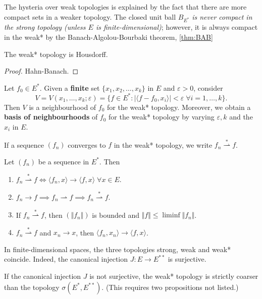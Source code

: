 \documentclass{article}
\theoremstyle{definition}
\numberwithin{equation}{section}
\begin{document}
	\begin{remark}
		The hysteria over weak topologies is explained by the fact that there are more compact sets in a weaker topology. The closed unit ball $B_{E^*}$ \textit{is never compact in the strong topology (unless $E$ is finite-dimensional)}; however, it is always compact in the weak* by the Banach-Algolou-Bourbaki theorem, \cref{thm:BAB}
	\end{remark}
	
	\begin{prop}
		The weak* topology is Housdorff.
	\end{prop}
	\begin{proof}
		Hahn-Banach.
	\end{proof}
	\begin{prop}
		Let $f_0\in E^*$. Given a \textbf{finite} set $\{x_1,x_2,\ldots,x_k\}$ in $E$ and $\varepsilon>0$, consider
		\[V=V(x_1,\ldots,x_k;\varepsilon)=\{f\in E^*:|\langle f-f_0,x_i\rangle|<\varepsilon\;\forall i=1,\ldots,k\}.\]
		Then $V$ is a neighbourhood of $f_0$ for the weak* topology. Moreover, we obtain a \textbf{basis of neighbourhoods} of $f_0$ for the weak* topology by varying $\varepsilon,k$ and the $x_i$ in $E$.
	\end{prop}
	If a sequence $(f_n)$ converges to $f$ in the weak* topology, we write $f_n\overset{*}{\rightharpoonup}f$.
	\begin{prop} Let $(f_n)$ be a sequence in $E^*$. Then
		\begin{enumerate}
			\item $f_n\overset{*}{\rightharpoonup}f \iff \langle f_n,x\rangle\to\langle f,x\rangle\;\forall x\in E$.
			\item $f_n\to f\implies f_n\rightharpoonup f\implies f_n\overset{*}{\rightharpoonup}f$.
			\item If $f_n\overset{*}{\rightharpoonup}f$, then $(\Vert f_n\Vert)$ is bounded and $\Vert f\Vert\leq\liminf\Vert f_n\Vert$.
			\item $f_n\overset{*}{\rightharpoonup}f$ and $x_n\to x$, then $\langle f_n,x_n\rangle\to\langle f,x\rangle$.
		\end{enumerate}
	\end{prop}
	\begin{remark}
		In finite-dimensional spaces, the three topologies strong, weak and weak* coincide. Indeed, the canonical injection $J:E\to E^{**}$ is surjective.
	\end{remark}
	\begin{remark}	
		If the canonical injection $J$ is not surjective, the weak* topology is strictly coarser than the topology $\sigma(E^*,E^{**})$. (This requires two propositions not listed.)
	\end{remark}
\end{document}
